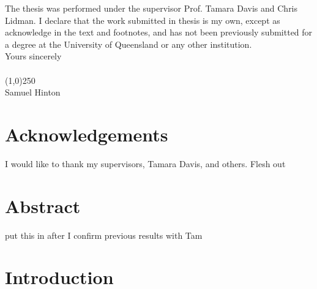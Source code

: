 \documentclass[titlesmallcaps, examinerscopy, copyrightpage]{uqthesis}
\newcommand{\red}{\color{red}}
\begin{document}
\noindent The thesis was performed under the supervisor Prof. Tamara Davis and Chris Lidman. I declare that the work submitted in thesis is my own, except as acknowledge in the text and footnotes, and has not been previously submitted for a degree at the University of Queensland or any other institution. \\

\noindent Yours sincerely \\ \\ 

\noindent \line(1,0){250} \\

\noindent Samuel Hinton


\chapter{Acknowledgements}

I would like to thank my supervisors, Tamara Davis, {\red and others. Flesh out}

\chapter{Abstract}



{\red put this in after I confirm previous results with Tam}



\hypersetup{pageanchor=true}

\tableofcontents


\mainmatter


\chapter{Introduction}
\end{document}
